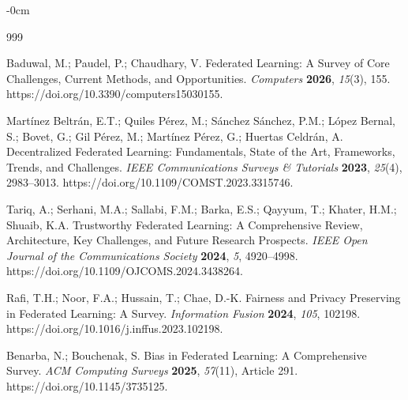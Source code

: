 \documentclass[futureinternet,article,submit,pdftex,moreauthors]{Definitions/mdpi}
\begin{document}
\begin{adjustwidth}{-\extralength}{0cm}



% 


\begin{thebibliography}{999}
	
Baduwal, M.; Paudel, P.; Chaudhary, V.
Federated Learning: A Survey of Core Challenges, Current Methods, and Opportunities.
\textit{Computers} \textbf{2026}, \textit{15}(3), 155.
https://doi.org/10.3390/computers15030155.

Martínez Beltrán, E.T.; Quiles Pérez, M.; Sánchez Sánchez, P.M.; López Bernal, S.; Bovet, G.; Gil Pérez, M.; Martínez Pérez, G.; Huertas Celdrán, A.
Decentralized Federated Learning: Fundamentals, State of the Art, Frameworks, Trends, and Challenges.
\textit{IEEE Communications Surveys \& Tutorials} \textbf{2023}, \textit{25}(4), 2983--3013.
https://doi.org/10.1109/COMST.2023.3315746.

Tariq, A.; Serhani, M.A.; Sallabi, F.M.; Barka, E.S.; Qayyum, T.; Khater, H.M.; Shuaib, K.A.
Trustworthy Federated Learning: A Comprehensive Review, Architecture, Key Challenges, and Future Research Prospects.
\textit{IEEE Open Journal of the Communications Society} \textbf{2024}, \textit{5}, 4920--4998.
https://doi.org/10.1109/OJCOMS.2024.3438264.

Rafi, T.H.; Noor, F.A.; Hussain, T.; Chae, D.-K.
Fairness and Privacy Preserving in Federated Learning: A Survey.
\textit{Information Fusion} \textbf{2024}, \textit{105}, 102198.
https://doi.org/10.1016/j.inffus.2023.102198.

Benarba, N.; Bouchenak, S.
Bias in Federated Learning: A Comprehensive Survey.
\textit{ACM Computing Surveys} \textbf{2025}, \textit{57}(11), Article 291.
https://doi.org/10.1145/3735125.


\end{thebibliography}
\end{adjustwidth}
\end{document}
